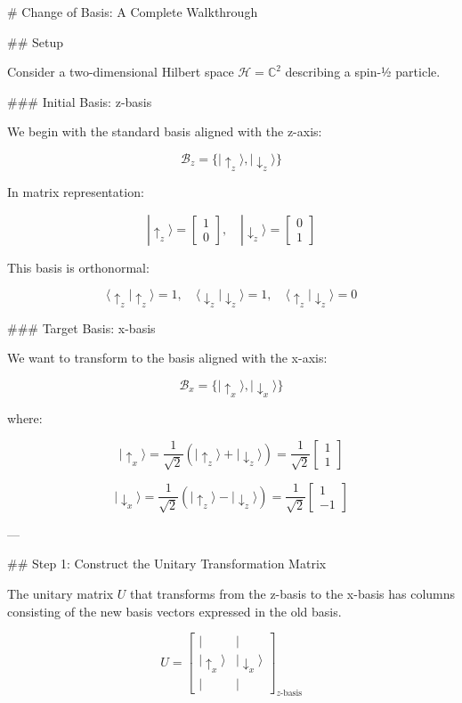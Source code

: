 # Change of Basis: A Complete Walkthrough

## Setup

Consider a two-dimensional Hilbert space $\mathcal{H} = \mathbb{C}^2$ describing a spin-½ particle.

### Initial Basis: z-basis

We begin with the standard basis aligned with the z-axis:

$$\mathcal{B}_z = \{|↑_z\rangle, |↓_z\rangle\}$$

In matrix representation:

$$|↑_z\rangle = \begin{bmatrix} 1 \\ 0 \end{bmatrix}, \quad |↓_z\rangle = \begin{bmatrix} 0 \\ 1 \end{bmatrix}$$

This basis is orthonormal:

$$\langle ↑_z | ↑_z \rangle = 1, \quad \langle ↓_z | ↓_z \rangle = 1, \quad \langle ↑_z | ↓_z \rangle = 0$$

### Target Basis: x-basis

We want to transform to the basis aligned with the x-axis:

$$\mathcal{B}_x = \{|↑_x\rangle, |↓_x\rangle\}$$

where:

$$|↑_x\rangle = \frac{1}{\sqrt{2}}(|↑_z\rangle + |↓_z\rangle) = \frac{1}{\sqrt{2}}\begin{bmatrix} 1 \\ 1 \end{bmatrix}$$

$$|↓_x\rangle = \frac{1}{\sqrt{2}}(|↑_z\rangle - |↓_z\rangle) = \frac{1}{\sqrt{2}}\begin{bmatrix} 1 \\ -1 \end{bmatrix}$$

---

## Step 1: Construct the Unitary Transformation Matrix

The unitary matrix $U$ that transforms from the z-basis to the x-basis has columns consisting of the new basis vectors expressed in the old basis.

$$U = \begin{bmatrix} | & | \\ |↑_x\rangle & |↓_x\rangle \\ | & | \end{bmatrix}_{z\text{-basis}}$$

